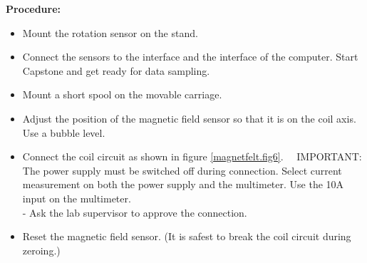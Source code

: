 \documentclass[../Elmag-labhefte-2020.tex]{subfiles}
\begin{document}
\textbf{Procedure:}
\begin{itemize}
    \item Mount the rotation sensor on the stand.
    \item Connect the sensors to the interface and the interface of the computer. Start Capstone and get ready for data sampling.
    \item Mount a short spool on the movable carriage.
    \item Adjust the position of the magnetic field sensor so that it is on the coil axis. Use a bubble level.
    \item Connect the coil circuit as shown in figure \ref{magnetfelt.fig6}. \ \
    IMPORTANT: The power supply must be switched off during connection. Select current measurement on both the power supply and the multimeter. Use the 10A input on the multimeter.\\
    - Ask the lab supervisor to approve the connection.
    \item Reset the magnetic field sensor. (It is safest to break the coil circuit during zeroing.)
      \begin{marginfigure}
        \centering
        \vspace{-6cm}

\end{marginfigure}
\end{itemize}
\end{document}
